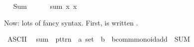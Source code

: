 \begin{isabellebody}
\isadelimproof
\ %
\endisadelimproof
%
\isatagproof
\isacommand{{\isachardot}{\kern0pt}{\isachardot}{\kern0pt}}\isamarkupfalse%
%
\endisatagproof
{\isafoldproof}%
%
\isadelimproof
%
\endisadelimproof
\isanewline
\isanewline
{}\isamarkupfalse%
\ Sum\ {\isacharparenleft}{\kern0pt}{\isachardoublequoteopen}{\isasymSum}{\isachardoublequoteclose}{\isacharparenright}{\kern0pt}\isanewline
\ \ \ {\isachardoublequoteopen}{\isasymSum}\ {\isasymequiv}\ sum\ {\isacharparenleft}{\kern0pt}{\isasymlambda}x{\isachardot}{\kern0pt}\ x{\isacharparenright}{\kern0pt}{\isachardoublequoteclose}\isanewline
\isanewline
{}\isamarkupfalse%
%
\begin{isamarkuptext}%
Now: lots of fancy syntax. First,  is written .%
\end{isamarkuptext}\isamarkuptrue%
\isamarkupfalse%
\ {\isacharparenleft}{\kern0pt}ASCII{\isacharparenright}{\kern0pt}\isanewline
\ \ {\isachardoublequoteopen}{\isacharunderscore}{\kern0pt}sum{\isachardoublequoteclose}\ {\isacharcolon}{\kern0pt}{\isacharcolon}{\kern0pt}\ {\isachardoublequoteopen}pttrn\ {\isasymRightarrow}\ {\isacharprime}{\kern0pt}a\ set\ {\isasymRightarrow}\ {\isacharprime}{\kern0pt}b\ {\isasymRightarrow}\ {\isacharprime}{\kern0pt}b{\isacharcolon}{\kern0pt}{\isacharcolon}{\kern0pt}comm{\isacharunderscore}{\kern0pt}monoid{\isacharunderscore}{\kern0pt}add{\isachardoublequoteclose}\ \ {\isacharparenleft}{\kern0pt}{\isachardoublequoteopen}{\isacharparenleft}{\kern0pt}{}SUM\ {\isacharparenleft}{\kern0pt}{\isacharunderscore}{\kern0pt}{\isacharslash}{\kern0pt}{\isacharcolon}{\kern0pt}{\isacharunderscore}{\kern0pt}{\isacharparenright}{\kern0pt}{\isachardot}{\kern0pt}{\isacharslash}{\kern0pt}\ {\isacharunderscore}{\kern0pt}{\isacharparenright}{\kern0pt}{\isachardoublequoteclose}\ {\isacharbrackleft}{\kern0pt}{}{\isacharcomma}{\kern0pt}\ {}{}{\isacharcomma}{\kern0pt}\ {}{}{\isacharbrackright}{\kern0pt}\ {}{}{\isacharparenright}{\kern0pt}\isanewline
{}\isamarkupfalse%
\isanewline

\end{isabellebody}
